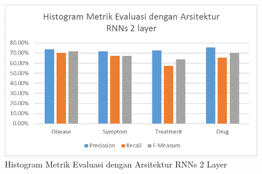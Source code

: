     \begin{figure}
    	\centering
    	\includegraphics[width=\linewidth]{images/best_old}
    	\caption{Histogram Metrik Evaluasi dengan Arsitektur RNNs 2 Layer}
    	\label{fig:owndict10}
    \end{figure}